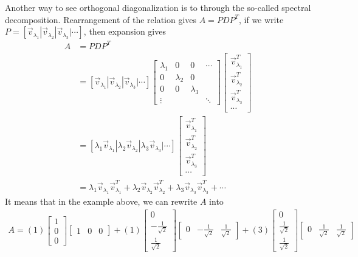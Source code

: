 Another way to see orthogonal diagonalization is to through the so-called spectral decomposition. Rearrangement of the relation gives $A = PDP^T$, if we write $P = [\vec{v}_{\lambda_1}|\vec{v}_{\lambda_2}|\vec{v}_{\lambda_3}|\cdots]$, then expansion gives
\begin{align*}
A &= PDP^T \\
&= [\vec{v}_{\lambda_1}|\vec{v}_{\lambda_2}|\vec{v}_{\lambda_3}|\cdots]
\begin{bmatrix}
\lambda_1 & 0 & 0 & \cdots \\
0 & \lambda_2 & 0 & \\
0 & 0 & \lambda_3 & \\
\vdots & & & \ddots
\end{bmatrix}
\left[
\begin{array}{c}
\vec{v}_{\lambda_1}^T \\
\hline
\vec{v}_{\lambda_2}^T \\
\hline
\vec{v}_{\lambda_3}^T \\
\hline
\cdots
\end{array}
\right] \\
&= 
[\lambda_1\vec{v}_{\lambda_1}|\lambda_2\vec{v}_{\lambda_2}|\lambda_3\vec{v}_{\lambda_3}|\cdots]
\left[
\begin{array}{c}
\vec{v}_{\lambda_1}^T \\
\hline
\vec{v}_{\lambda_2}^T \\
\hline
\vec{v}_{\lambda_3}^T \\
\hline
\cdots
\end{array}
\right] \\
&= \lambda_1 \vec{v}_{\lambda_1}\vec{v}_{\lambda_1}^T + \lambda_2 \vec{v}_{\lambda_2}\vec{v}_{\lambda_2}^T + \lambda_3 \vec{v}_{\lambda_3}\vec{v}_{\lambda_3}^T + \cdots
\end{align*}
It means that in the example above, we can rewrite $A$ into
\begin{align*}
A = (1)
\begin{bmatrix}
1 \\
0 \\
0
\end{bmatrix}
\begin{bmatrix}
1 & 0 & 0
\end{bmatrix}
+(1)
\begin{bmatrix}
0 \\
-\frac{1}{\sqrt{2}} \\
\frac{1}{\sqrt{2}}
\end{bmatrix}
\begin{bmatrix}
0 & -\frac{1}{\sqrt{2}} & \frac{1}{\sqrt{2}}
\end{bmatrix}
+(3)
\begin{bmatrix}
0 \\
\frac{1}{\sqrt{2}} \\
\frac{1}{\sqrt{2}}
\end{bmatrix}
\begin{bmatrix}
0 & \frac{1}{\sqrt{2}} & \frac{1}{\sqrt{2}}
\end{bmatrix}
\end{align*}

